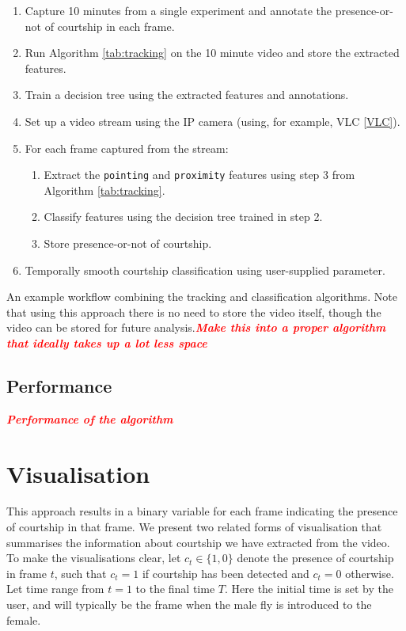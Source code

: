 \documentclass[twocolumn]{article}
\newcommand{\todo}[1]{\textsf{\emph{\textbf{\textcolor{red}{#1}}}}}
\newcommand{\var}[1]{\texttt{#1}}
\begin{document}
\begin{table}
\begin{enumerate}
	\item Capture 10 minutes from a single experiment and annotate the presence-or-not of courtship in each frame.
	\item Run Algorithm \ref{tab:tracking} on the 10 minute video and store the extracted features.
	\item Train a decision tree using the extracted features and annotations.
	\item Set up a video stream using the IP camera (using, for example, VLC \ref{VLC}). 
	\item For each frame captured from the stream:
	\begin{enumerate}
		\item Extract the \var{pointing} and \var{proximity} features using step 3 from Algorithm \ref{tab:tracking}.
		\item Classify features using the decision tree trained in step 2.
		\item Store presence-or-not of courtship.
	\end{enumerate}
	\item Temporally smooth courtship classification using user-supplied parameter.
\end{enumerate}
		
\label{tab:tracking}
\caption{An example workflow combining the tracking and classification algorithms. Note that using this approach there is no need to store the video itself, though the video can be stored for future analysis.\todo{Make this into a proper algorithm that ideally takes up a lot less space}}
\end{table}

\subsection{Performance}

\todo{Performance of the algorithm}

\section{Visualisation}
\label{sec:visualisation}

This approach results in a binary variable for each frame indicating the presence of courtship in that frame. We present two related forms of visualisation that summarises the information about courtship we have extracted from the video. To make the visualisations clear, let $c_t \in \{1,0\}$ denote the presence of courtship in frame $t$, such that $c_t = 1$ if courtship has been detected and $c_t = 0$ otherwise. Let time range from $t=1$ to the final time $T$. Here the initial time is set by the user, and will typically be the frame when the male fly is introduced to the female.
\end{document}
